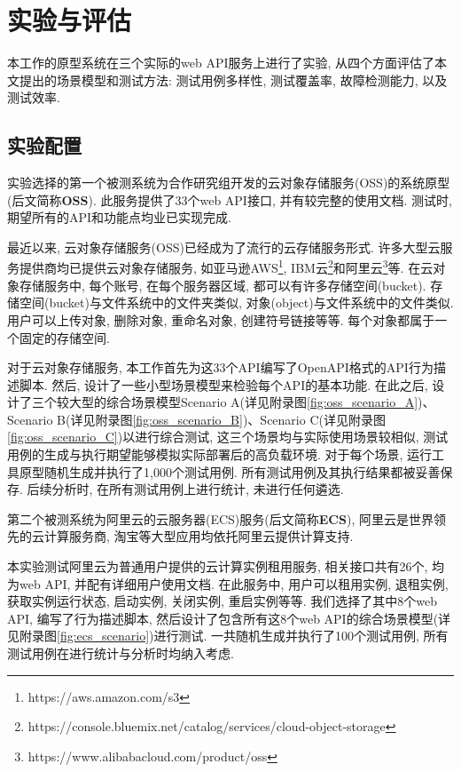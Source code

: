 \chapter{实验与评估}
    \label{sec:experiment}

    本工作的原型系统在三个实际的web API服务上进行了实验, 从四个方面评估了本文提出的场景模型和测试方法: 测试用例多样性, 测试覆盖率, 故障检测能力, 以及测试效率.
    
    \section{实验配置}
        实验选择的第一个被测系统为合作研究组开发的云对象存储服务(OSS)的系统原型(后文简称\textbf{OSS}). 此服务提供了33个web API接口, 并有较完整的使用文档. 测试时, 期望所有的API和功能点均业已实现完成.
        
        最近以来, 云对象存储服务(OSS)已经成为了流行的云存储服务形式. 许多大型云服务提供商均已提供云对象存储服务, 如亚马逊AWS\footnote{https://aws.amazon.com/s3}, IBM云\footnote{ https://console.bluemix.net/catalog/services/cloud-object-storage}和阿里云\footnote{ https://www.alibabacloud.com/product/oss}等. 在云对象存储服务中, 每个账号, 在每个服务器区域, 都可以有许多存储空间(bucket). 存储空间(bucket)与文件系统中的文件夹类似, 对象(object)与文件系统中的文件类似. 用户可以上传对象, 删除对象, 重命名对象, 创建符号链接等等. 每个对象都属于一个固定的存储空间.
        
        对于云对象存储服务, 本工作首先为这33个API编写了OpenAPI格式的API行为描述脚本. 然后, 设计了一些小型场景模型来检验每个API的基本功能. 在此之后, 设计了三个较大型的综合场景模型Scenario A(详见附录图\ref{fig:oss_scenario_A})、Scenario B(详见附录图\ref{fig:oss_scenario_B})、Scenario C(详见附录图\ref{fig:oss_scenario_C})以进行综合测试, 这三个场景均与实际使用场景较相似, 测试用例的生成与执行期望能够模拟实际部署后的高负载环境. 对于每个场景, 运行工具原型随机生成并执行了1,000个测试用例. 所有测试用例及其执行结果都被妥善保存. 后续分析时, 在所有测试用例上进行统计, 未进行任何遴选.
        
        第二个被测系统为阿里云的云服务器(ECS)服务(后文简称\textbf{ECS}), 阿里云是世界领先的云计算服务商, 淘宝等大型应用均依托阿里云提供计算支持. 
        
        本实验测试阿里云为普通用户提供的云计算实例租用服务, 相关接口共有26个, 均为web API, 并配有详细用户使用文档. 在此服务中, 用户可以租用实例, 退租实例, 获取实例运行状态, 启动实例, 关闭实例, 重启实例等等. 我们选择了其中8个web API, 编写了行为描述脚本, 然后设计了包含所有这8个web API的综合场景模型(详见附录图\ref{fig:ecs_scenario})进行测试. 一共随机生成并执行了100个测试用例, 所有测试用例在进行统计与分析时均纳入考虑.
        
